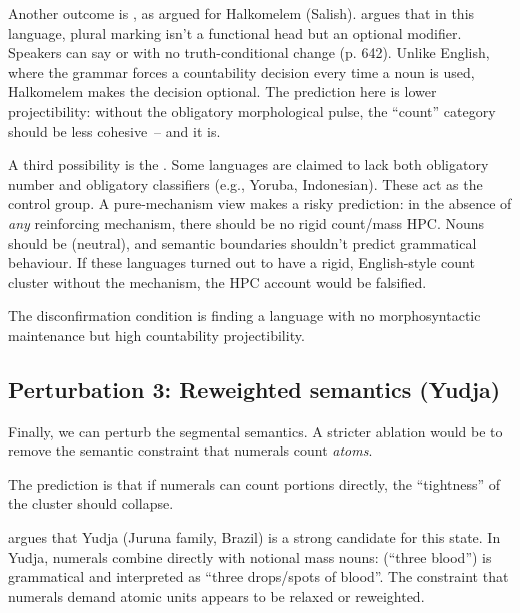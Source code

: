 Another outcome is , as argued for Halkomelem (Salish). \textcite{wiltschko2008} argues that in this language, plural marking isn't a functional head but an optional modifier. Speakers can say  or  with no truth-conditional change (p. 642). Unlike English, where the grammar forces a countability decision every time a noun is used, Halkomelem makes the decision optional. The prediction here is lower projectibility: without the obligatory morphological pulse, the \enquote{count} category should be less cohesive~-- and it is.

A third possibility is the . Some languages are claimed to lack both obligatory number and obligatory classifiers (e.g., Yoruba, Indonesian). These act as the control group. A pure-mechanism view makes a risky prediction: in the absence of \emph{any} reinforcing mechanism, there should be no rigid count/mass HPC. Nouns should be  (neutral), and semantic boundaries shouldn't predict grammatical behaviour. If these languages turned out to have a rigid, English-style count cluster without the mechanism, the HPC account would be falsified.

The disconfirmation condition is finding a language with no morphosyntactic maintenance but high countability projectibility.

\subsection{Perturbation 3: Reweighted semantics (Yudja)}
\label{sec:9:yudja}

Finally, we can perturb the segmental semantics. A stricter ablation would be to remove the semantic constraint that numerals count \emph{atoms}.

The prediction is that if numerals can count portions directly, the \enquote{tightness} of the cluster should collapse.

\textcite{lima2014} argues that Yudja (Juruna family, Brazil) is a strong candidate for this state. In Yudja, numerals combine directly with notional mass nouns:  (\enquote{three blood}) is grammatical and interpreted as \enquote{three drops/spots of blood}. The constraint that numerals demand atomic units appears to be relaxed or reweighted.

